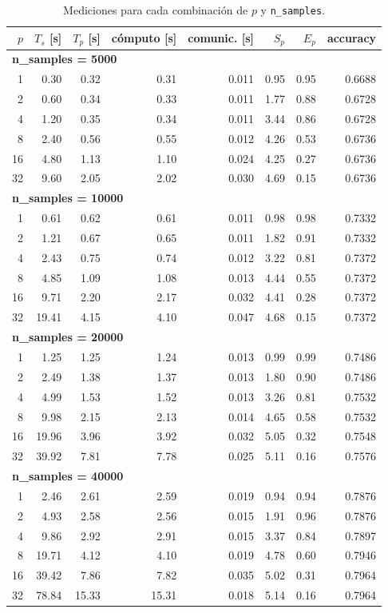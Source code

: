 \documentclass[11pt,a4paper]{article}
\begin{document}
\begin{table}[H]
\centering\small
\begin{tabular}{rrrrrrrr}
\toprule
$p$ & $T_s$ [s] & $T_p$ [s] & cómputo [s] & comunic. [s] & $S_p$ & $E_p$ & accuracy \\
\midrule
\multicolumn{8}{l}{\textbf{n\_samples = 5000}}\\
\midrule
1 & 0.30 & 0.32 & 0.31 & 0.011 & 0.95 & 0.95 & 0.6688 \\
2 & 0.60 & 0.34 & 0.33 & 0.011 & 1.77 & 0.88 & 0.6728 \\
4 & 1.20 & 0.35 & 0.34 & 0.011 & 3.44 & 0.86 & 0.6728 \\
8 & 2.40 & 0.56 & 0.55 & 0.012 & 4.26 & 0.53 & 0.6736 \\
16 & 4.80 & 1.13 & 1.10 & 0.024 & 4.25 & 0.27 & 0.6736 \\
32 & 9.60 & 2.05 & 2.02 & 0.030 & 4.69 & 0.15 & 0.6736 \\
\midrule
\multicolumn{8}{l}{\textbf{n\_samples = 10000}}\\
\midrule
1 & 0.61 & 0.62 & 0.61 & 0.011 & 0.98 & 0.98 & 0.7332 \\
2 & 1.21 & 0.67 & 0.65 & 0.011 & 1.82 & 0.91 & 0.7332 \\
4 & 2.43 & 0.75 & 0.74 & 0.012 & 3.22 & 0.81 & 0.7372 \\
8 & 4.85 & 1.09 & 1.08 & 0.013 & 4.44 & 0.55 & 0.7372 \\
16 & 9.71 & 2.20 & 2.17 & 0.032 & 4.41 & 0.28 & 0.7372 \\
32 & 19.41 & 4.15 & 4.10 & 0.047 & 4.68 & 0.15 & 0.7372 \\
\midrule
\multicolumn{8}{l}{\textbf{n\_samples = 20000}}\\
\midrule
1 & 1.25 & 1.25 & 1.24 & 0.013 & 0.99 & 0.99 & 0.7486 \\
2 & 2.49 & 1.38 & 1.37 & 0.013 & 1.80 & 0.90 & 0.7486 \\
4 & 4.99 & 1.53 & 1.52 & 0.013 & 3.26 & 0.81 & 0.7532 \\
8 & 9.98 & 2.15 & 2.13 & 0.014 & 4.65 & 0.58 & 0.7532 \\
16 & 19.96 & 3.96 & 3.92 & 0.032 & 5.05 & 0.32 & 0.7548 \\
32 & 39.92 & 7.81 & 7.78 & 0.025 & 5.11 & 0.16 & 0.7576 \\
\midrule
\multicolumn{8}{l}{\textbf{n\_samples = 40000}}\\
\midrule
1 & 2.46 & 2.61 & 2.59 & 0.019 & 0.94 & 0.94 & 0.7876 \\
2 & 4.93 & 2.58 & 2.56 & 0.015 & 1.91 & 0.96 & 0.7876 \\
4 & 9.86 & 2.92 & 2.91 & 0.015 & 3.37 & 0.84 & 0.7897 \\
8 & 19.71 & 4.12 & 4.10 & 0.019 & 4.78 & 0.60 & 0.7946 \\
16 & 39.42 & 7.86 & 7.82 & 0.035 & 5.02 & 0.31 & 0.7964 \\
32 & 78.84 & 15.33 & 15.31 & 0.018 & 5.14 & 0.16 & 0.7964 \\
\bottomrule
\end{tabular}
\caption{Mediciones para cada combinación de $p$ y \texttt{n\_samples}.}
\label{tab:resultados}
\end{table}
\end{document}
